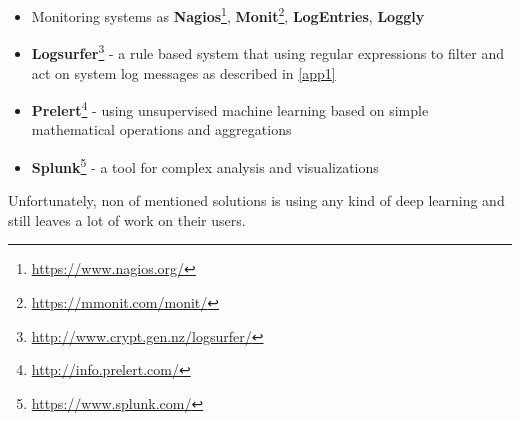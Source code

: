 \begin{itemize}
\item Monitoring systems as \textbf{Nagios}\footnote{\url{https://www.nagios.org/}}, \textbf{Monit}\footnote{\url{https://mmonit.com/monit/}}, \textbf{LogEntries}, \textbf{Loggly}
\item \textbf{Logsurfer}\footnote{\url{http://www.crypt.gen.nz/logsurfer/}} - \cite{prewett2003analyzing} a rule based system that using regular
expressions to filter and act on system log messages as described in \ref{app1}
\item \textbf{Prelert}\footnote{\url{http://info.prelert.com/}} - using unsupervised machine learning based on simple mathematical operations and aggregations
\item \textbf{Splunk}\footnote{\url{https://www.splunk.com/}} - a tool for complex analysis and visualizations
\end{itemize}

Unfortunately, non of mentioned solutions is using any kind of deep learning and still leaves a lot of work on their users.